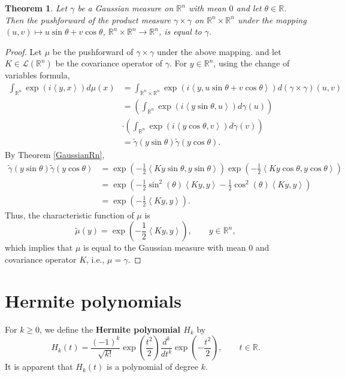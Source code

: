 \documentclass{article}
\newcommand{\inner}[2]{\left\langle #1, #2 \right\rangle}
\newtheorem{theorem}{Theorem}
\theoremstyle{definition}
\begin{document}
\begin{theorem}
Let $\gamma$ be a Gaussian measure on $\mathbb{R}^n$ with mean $0$ and let $\theta \in \mathbb{R}$.
Then the pushforward of the product measure $\gamma \times \gamma$ on $\mathbb{R}^n \times \mathbb{R}^n$
under the mapping $(u,v) \mapsto u \sin \theta + v \cos\theta$, $\mathbb{R}^n \times \mathbb{R}^n \to
\mathbb{R}^n$, is equal to $\gamma$. 
\label{sincos}
\end{theorem}
\begin{proof}
Let $\mu$ be the pushforward of $\gamma \times \gamma$ under the above mapping. 
and let $K \in \mathscr{L}(\mathbb{R}^n)$ be the covariance operator of $\gamma$.
For $y \in \mathbb{R}^n$, using the change of variables formula,
\begin{align*}
\int_{\mathbb{R}^n} \exp\left( i \inner{y}{x} \right) d\mu(x)&=\int_{\mathbb{R}^n \times \mathbb{R}^n} \exp\left(i\inner{y}{u \sin \theta + v \cos\theta}\right)
d(\gamma \times \gamma)(u,v)\\
&=\left(\int_{\mathbb{R}^n} \exp\left(i  \inner{y \sin \theta}{u} \right) d\gamma(u) \right)\\
&\cdot \left(\int_{\mathbb{R}^n} \exp\left(i  \inner{y \cos \theta}{v} \right) d\gamma(v) \right)\\
&=\widetilde{\gamma}(y\sin\theta) \widetilde{\gamma}(y\cos\theta).
\end{align*}
By Theorem \ref{GaussianRn},
\begin{align*}
\widetilde{\gamma}(y\sin\theta) \widetilde{\gamma}(y\cos\theta)&=\exp\left(-\frac{1}{2}\inner{Ky\sin\theta}{y\sin\theta} \right)
\exp\left(-\frac{1}{2}\inner{Ky\cos\theta}{y\cos\theta} \right)\\
&=\exp\left(-\frac{1}{2}\sin^2 (\theta) \inner{Ky}{y}-\frac{1}{2}\cos^2(\theta) \inner{Ky}{y} \right)\\
&=\exp\left(-\frac{1}{2}\inner{Ky}{y}\right).
\end{align*}
Thus, the characteristic function of $\mu$ is
\[
\widetilde{\mu}(y) = \exp\left(-\frac{1}{2}\inner{Ky}{y}\right), \qquad y \in \mathbb{R}^n,
\]
which implies that $\mu$ is equal to the Gaussian measure with mean $0$ and covariance operator $K$, i.e.,
$\mu=\gamma$. 
\end{proof}



\section{Hermite polynomials}
For $k \geq 0$, we define the \textbf{Hermite polynomial $H_k$} by
\[
H_k(t) = \frac{(-1)^k}{\sqrt{k!}} \exp\left(\frac{t^2}{2}\right) \frac{d^k}{dt^k} \exp\left(-\frac{t^2}{2}\right),
\qquad t \in \mathbb{R}.
\]
It is apparent that $H_k(t)$ is a polynomial of  degree $k$. 
\end{document}
